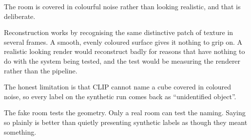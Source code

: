 The room is covered in colourful noise rather than looking realistic, and that is deliberate.

Reconstruction works by recognising the same distinctive patch of texture in several frames. A
smooth, evenly coloured surface gives it nothing to grip on. A realistic looking render would
reconstruct badly for reasons that have nothing to do with the system being tested, and the test
would be measuring the renderer rather than the pipeline.

\begin{watch}
The honest limitation is that CLIP cannot name a cube covered in coloured noise, so every label on
the synthetic run comes back as ``unidentified object''.

The fake room tests the geometry. Only a real room can test the naming. Saying so plainly is
better than quietly presenting synthetic labels as though they meant something.
\end{watch}
